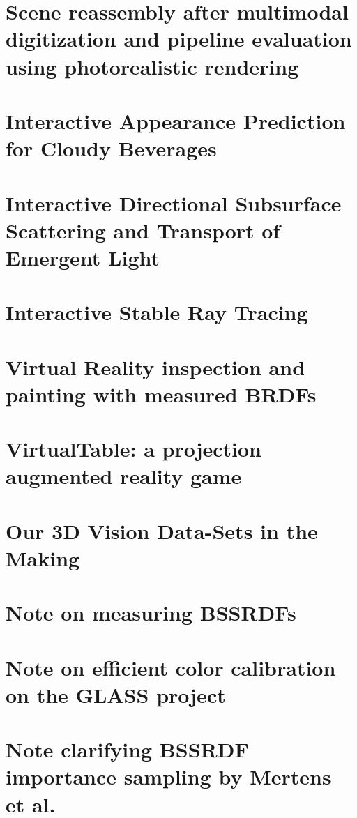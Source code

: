 \chapter{Scene reassembly after multimodal digitization and pipeline evaluation using photorealistic rendering}
\label{sec:glass}


\chapter{Interactive Appearance Prediction for Cloudy Beverages}
\label{sec:juice}


\chapter{Interactive Directional Subsurface Scattering and Transport of Emergent Light}
\label{sec:interactivedirsss}


\chapter{Interactive Stable Ray Tracing}
\label{sec:srt}


\chapter{Virtual Reality inspection and painting with measured BRDFs}
\label{sec:vrbrdf}


\chapter{VirtualTable: a projection augmented reality game}
\label{sec:virtualtable}


\chapter{Our 3D Vision Data-Sets in the Making}
\label{sec:robdataset}


\chapter{Note on measuring BSSRDFs}
\label{sec:bssrdfnote}


\chapter{Note on efficient color calibration on the GLASS project}
\label{sec:colornote}


\chapter{Note clarifying BSSRDF importance sampling by Mertens et al.}
\label{sec:mertensnote}


